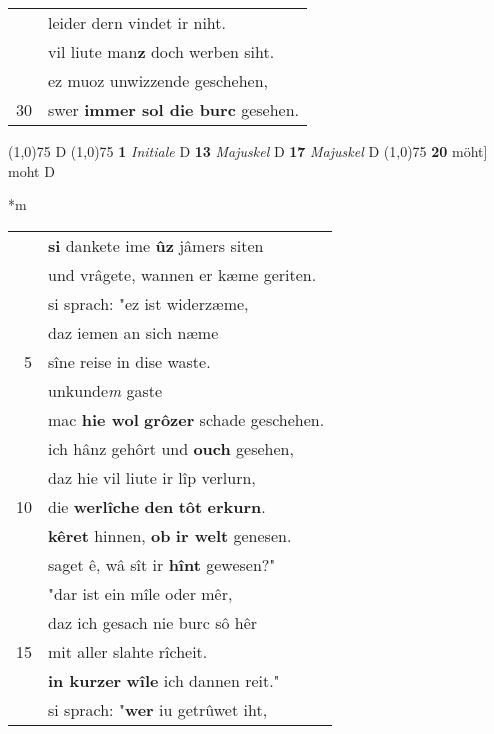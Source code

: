 \documentclass[8pt,a4paper,notitlepage]{article}
\begin{document}
\begin{table}[ht]
\begin{minipage}[t]{0.5\linewidth}
\begin{tabular}{rl}
 & leider dern vindet ir niht.\\ 
 & vil liute man\textbf{z} doch werben siht.\\ 
 & ez muoz unwizzende geschehen,\\ 
30 & swer \textbf{immer sol die burc} gesehen.\\ 
\end{tabular}
\scriptsize
\line(1,0){75} \newline
D \newline
\line(1,0){75} \newline
\textbf{1} \textit{Initiale} D  \textbf{13} \textit{Majuskel} D  \textbf{17} \textit{Majuskel} D  \newline
\line(1,0){75} \newline
\textbf{20} möht] moht D \newline
\end{minipage}
\hspace{0.5cm}
\begin{minipage}[t]{0.5\linewidth}
\small
\begin{center}*m
\end{center}
\begin{tabular}{rl}
 & \textbf{si} dankete ime \textbf{ûz} jâmers siten\\ 
 & und vrâgete, wannen er kæme geriten.\\ 
 & si sprach: "ez ist widerzæme,\\ 
 & daz iemen an sich næme\\ 
5 & sîne reise in dise waste.\\ 
 & unkunde\textit{m} gaste\\ 
 & mac \textbf{hie wol} \textbf{grôzer} schade geschehen.\\ 
 & ich hânz gehôrt und \textbf{ouch} gesehen,\\ 
 & daz hie vil liute ir lîp verlurn,\\ 
10 & die \textbf{werlîche} \textbf{den} \textbf{tôt} \textbf{erkurn}.\\ 
 & \textbf{kêret} hinnen, \textbf{ob} \textbf{ir welt} genesen.\\ 
 & saget ê, wâ sît ir \textbf{hînt} gewesen?"\\ 
 & "dar ist ein mîle oder mêr,\\ 
 & daz ich gesach nie burc sô hêr\\ 
15 & mit aller slahte rîcheit.\\ 
 & \textbf{in kurzer} \textbf{wîle} ich dannen reit."\\ 
 & si sprach: "\textbf{wer} iu getrûwet iht,\\ 

\end{tabular}
\end{minipage}
\end{table}
\end{document}
